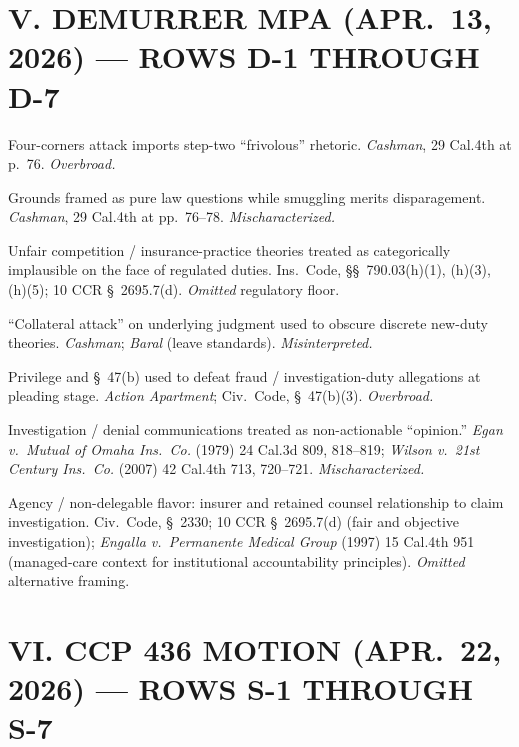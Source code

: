 \section*{V. DEMURRER MPA (APR.\ 13, 2026) --- ROWS D-1 THROUGH D-7}

\begin{description}
\tightlist
\item[D-1.] Four-corners attack imports step-two ``frivolous'' rhetoric. \textit{Cashman}, 29 Cal.4th at p.\ 76. \textit{Overbroad.}
\item[D-2.] Grounds framed as pure law questions while smuggling merits disparagement. \textit{Cashman}, 29 Cal.4th at pp.\ 76--78. \textit{Mischaracterized.}
\item[D-3.] Unfair competition / insurance-practice theories treated as categorically implausible on the face of regulated duties. Ins.\ Code, \S\S~790.03(h)(1), (h)(3), (h)(5); 10 CCR \S~2695.7(d). \textit{Omitted} regulatory floor.
\item[D-4.] ``Collateral attack'' on underlying judgment used to obscure discrete new-duty theories. \textit{Cashman}; \textit{Baral} (leave standards). \textit{Misinterpreted.}
\item[D-5.] Privilege and \S~47(b) used to defeat fraud / investigation-duty allegations at pleading stage. \textit{Action Apartment}; Civ.\ Code, \S~47(b)(3). \textit{Overbroad.}
\item[D-6.] Investigation / denial communications treated as non-actionable ``opinion.'' \textit{Egan v.\ Mutual of Omaha Ins.\ Co.} (1979) 24 Cal.3d 809, 818--819; \textit{Wilson v.\ 21st Century Ins.\ Co.} (2007) 42 Cal.4th 713, 720--721. \textit{Mischaracterized.}
\item[D-7.] Agency / non-delegable flavor: insurer and retained counsel relationship to claim investigation. Civ.\ Code, \S~2330; 10 CCR \S~2695.7(d) (fair and objective investigation); \textit{Engalla v.\ Permanente Medical Group} (1997) 15 Cal.4th 951 (managed-care context for institutional accountability principles). \textit{Omitted} alternative framing.
\end{description}

\section*{VI. CCP 436 MOTION (APR.\ 22, 2026) --- ROWS S-1 THROUGH S-7}

